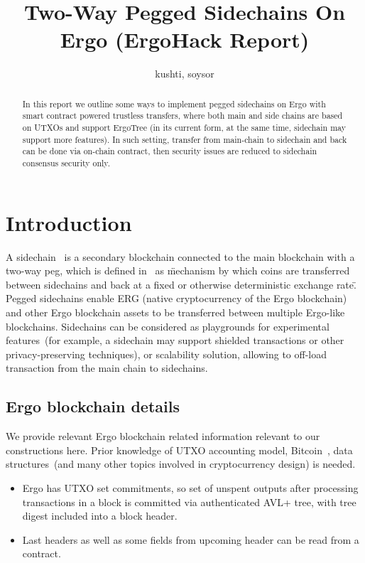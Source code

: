 \documentclass{article}   %
\begin{document}
\title{Two-Way Pegged Sidechains On Ergo (ErgoHack Report)}
\author{kushti, soysor}


\maketitle

\begin{abstract}
In this report we outline some ways to implement pegged sidechains on Ergo with smart contract powered trustless transfers, where both main and
  side chains are based on UTXOs and support ErgoTree (in its current form, at the same time, sidechain may support more features).
In such setting, transfer from main-chain to sidechain and back can be done via on-chain contract, then security issues are reduced to
  sidechain consensus security only.
\end{abstract}


\section{Introduction}

A sidechain~\cite{back2014enabling} is a secondary blockchain connected to the main blockchain with a two-way peg, which is defined
 in~\cite{back2014enabling} as \"mechanism by which coins are transferred between sidechains and
back at a fixed or otherwise deterministic exchange rate\". Pegged sidechains enable ERG (native cryptocurrency of the Ergo blockchain)
and other Ergo blockchain assets to be transferred between multiple Ergo-like blockchains. Sidechains can be considered as playgrounds for experimental features~(for example, a sidechain may support shielded transactions or other privacy-preserving
techniques), or scalability solution, allowing to off-load transaction from the main chain to sidechains.

\subsection{Ergo blockchain details}

We provide relevant Ergo blockchain related information relevant to our constructions here. Prior knowledge of UTXO
accounting model, Bitcoin~\cite{nakamoto2009}, data structures~(and many other topics involved in cryptocurrency design) is needed.
\begin{itemize}
\item{} Ergo has UTXO set commitments, so set of unspent outputs after processing transactions in a block is committed via
authenticated AVL+ tree, with tree digest included into a block header.
\item{} Last headers as well as some fields from upcoming header can be read from a contract.
\end{itemize}
\end{document}
